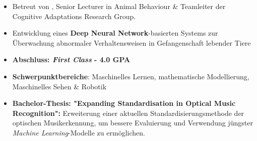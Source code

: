 \documentclass[10pt,a4paper,ragged2e,withhyper]{altacv}
\begin{document}
\begin{paracol}{2}
\begin{itemize}
    \item Betreut von , Senior Lecturer in Animal Behaviour \& Teamleiter der Cognitive Adaptations Research Group.
    \item Entwicklung eines \textbf{Deep Neural Network}-basierten Systems zur Überwachung abnormaler Verhaltensweisen in Gefangenschaft lebender Tiere
\end{itemize}




\begin{itemize}
    \item \textbf{Abschluss: \emph{First Class} - 4.0 GPA}
    \item \textbf{Schwerpunktbereiche}: Maschinelles Lernen, mathematische Modellierung, Maschinelles Sehen \& Robotik
    \item \textbf{Bachelor-Thesis: "Expanding Standardisation in Optical Music Recognition":} Erweiterung einer aktuellen Standardisierungsmethode der optischen Musikerkennung, um bessere Evaluierung und Verwendung jüngster \emph{Machine Learning}-Modelle zu ermöglichen.
\end{itemize}

\newpage




\end{paracol}
\end{document}

